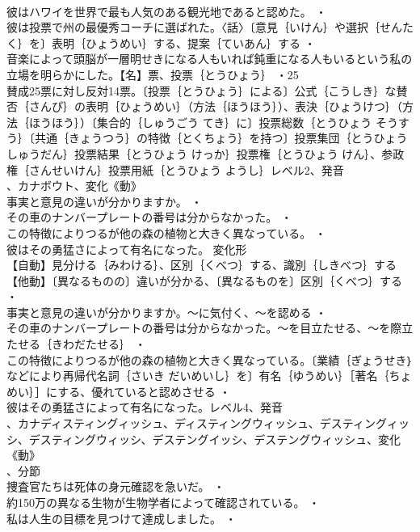 \documentclass[8pt]{extreport}
\begin{document}
\begin{CJK}{UTF8}{min}
\\	彼はハワイを世界で最も人気のある観光地であると認めた。 ・
\\	彼は投票で州の最優秀コーチに選ばれた。〈話〉〔意見｛いけん｝や選択｛せんたく｝を〕表明｛ひょうめい｝する、提案｛ていあん｝する ・
\\	音楽によって頭脳が一層明せきになる人もいれば鈍重になる人もいるという私の立場を明らかにした。【名】票、投票｛とうひょう｝ ・25 
\\	賛成25票に対し反対14票。〔投票｛とうひょう｝による〕公式｛こうしき｝な賛否｛さんぴ｝の表明｛ひょうめい｝（方法｛ほうほう｝）、表決｛ひょうけつ｝（方法｛ほうほう｝）〔集合的｛しゅうごう てき｝に〕投票総数｛とうひょう そうすう｝〔共通｛きょうつう｝の特徴｛とくちょう｝を持つ〕投票集団｛とうひょう しゅうだん｝投票結果｛とうひょう けっか｝投票権｛とうひょう けん｝、参政権｛さんせいけん｝投票用紙｛とうひょう ようし｝レベル2、発音
\\	、カナボウト、変化《動》
\\	事実と意見の違いが分かりますか。 ・
\\	その車のナンバープレートの番号は分からなかった。 ・
\\	この特徴によりつるが他の森の植物と大きく異なっている。 ・
\\	彼はその勇猛さによって有名になった。	変化形 
\\	【自動】見分ける｛みわける｝、区別｛くべつ｝する、識別｛しきべつ｝する【他動】〔異なるものの〕違いが分かる、〔異なるものを〕区別｛くべつ｝する ・
\\	事実と意見の違いが分かりますか。～に気付く、～を認める ・
\\	その車のナンバープレートの番号は分からなかった。～を目立たせる、～を際立たせる｛きわだたせる｝ ・
\\	この特徴によりつるが他の森の植物と大きく異なっている。〔業績｛ぎょうせき｝などにより再帰代名詞｛さいき だいめいし｝を〕有名｛ゆうめい｝［著名｛ちょめい｝］にする、優れていると認めさせる ・
\\	彼はその勇猛さによって有名になった。レベル4、発音
\\	、カナディスティングィッシュ、ディスティングウィッシュ、デスティングィッシ、デスティングウィッシ、デステングイッシ、デステングウィッシュ、変化《動》
\\	、分節
\\	捜査官たちは死体の身元確認を急いだ。 ・
\\	約150万の異なる生物が生物学者によって確認されている。 ・
\\	私は人生の目標を見つけて達成しました。 ・

\end{CJK}
\end{document}
